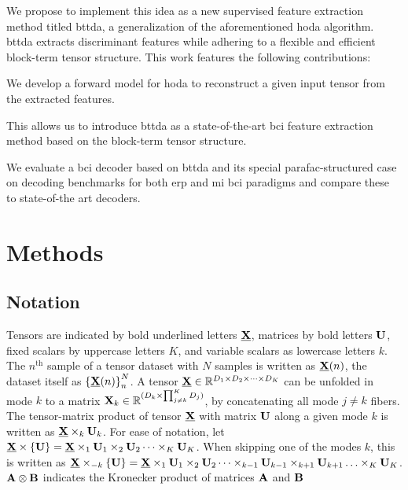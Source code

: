 \documentclass[twocolumn]{article}
\begin{document}
We propose to implement this idea as a new supervised feature
extraction method titled \ac{bttda}, a generalization of the aforementioned
\ac{hoda} algorithm.
\Ac{bttda} extracts discriminant features while adhering to a
flexible and efficient block-term tensor structure.
This work features the following contributions:
\begin{enumerate*}[label={\arabic*)}]
	\item We develop a forward model for \ac{hoda} to reconstruct a
	      given input tensor from the extracted features.
	\item This allows us to introduce \ac{bttda} as a state-of-the-art \ac{bci}
	      feature extraction method based on the block-term tensor structure.
	\item We evaluate a \ac{bci} decoder based on \ac{bttda} and its special
	      \ac{parafac}-structured case on decoding benchmarks for both \ac{erp}
	      and \ac{mi}
	      \ac{bci} paradigms and compare these to state-of-the art decoders.
\end{enumerate*}

\section{Methods}

\subsection{Notation}
Tensors are indicated by bold underlined letters $\ten{X}$, matrices by bold
letters $\mat{U}$, fixed scalars by uppercase letters $K$, and variable
scalars as lowercase letters $k$.
The $n^\text{th}$ sample of a tensor dataset with $N$ samples is written as
$\ten{X}(n)$, the dataset itself as ${\{\ten{X}(n)\}}_n^N$.
A tensor $\ten{X}\in \mathbb{R}^{D_1\times D_2 \times \cdots \times D_K}$ can be
unfolded in mode $k$ to a matrix
$\mat{X}_k\in\mathbb{R}^{(D_k\times\prod_{j\neq k}^K D_j)}$, by concatenating
all mode $j\neq k$ fibers.
The tensor-matrix product of tensor $\ten{X}$ with matrix $\mat{U}$ along a
given mode $k$ is written as $\ten{X}\mpr{\mat{U}}{k}$. For ease of notation, let
$\ten{X}\mmpr{\mat{U}} =
	\ten{X}\mpr{\mat{U}}{1}\mpr{\mat{U}}{2}\cdots\mpr{\mat{U}}{K}$.
When skipping one of the modes $k$, this is
written as $\ten{X}\mmprs{\mat{U}}{k} =
	\ten{X}\mpr{\mat{U}}{1}\mpr{\mat{U}}{2}\cdots\mpr{\mat{U}}{k-1}\mpr{\mat{U}}{k+1}\ldots\mpr{\mat{U}}{K}$.
$\mat{A}\otimes\mat{B}$ indicates the Kronecker product of matrices $\mat{A}$ and $\mat{B}$
\end{document}
